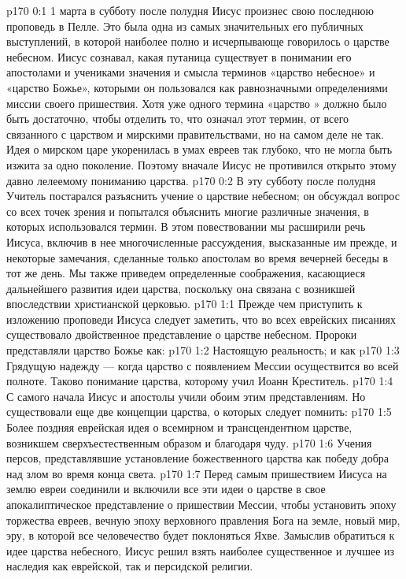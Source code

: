 \author{Комиссия срединников}
\vs p170 0:1 1 марта в субботу после полудня Иисус произнес свою последнюю проповедь в Пелле. Это была одна из самых значительных его публичных выступлений, в которой наиболее полно и исчерпывающе говорилось о царстве небесном. Иисус сознавал, какая путаница существует в понимании его апостолами и учениками значения и смысла терминов «царство небесное» и «царство Божье», которыми он пользовался как равнозначными определениями миссии своего пришествия. Хотя уже одного термина «царство » должно было быть достаточно, чтобы отделить то, что означал этот термин, от всего связанного с  царством и мирскими правительствами, но на самом деле не так. Идея о мирском царе укоренилась в умах евреев так глубоко, что не могла быть изжита за одно поколение. Поэтому вначале Иисус не противился открыто этому давно лелеемому пониманию царства.
\vs p170 0:2 В эту субботу после полудня Учитель постарался разъяснить учение о царствие небесном; он обсуждал вопрос со всех точек зрения и попытался объяснить многие различные значения, в которых использовался термин. В этом повествовании мы расширили речь Иисуса, включив в нее многочисленные рассуждения, высказанные им прежде, и некоторые замечания, сделанные только апостолам во время вечерней беседы в тот же день. Мы также приведем определенные соображения, касающиеся дальнейшего развития идеи царства, поскольку она связана с возникшей впоследствии христианской церковью.
\vs p170 1:1 Прежде чем приступить к изложению проповеди Иисуса следует заметить, что во всех еврейских писаниях существовало двойственное представление о царстве небесном. Пророки представляли царство Божье как:
\vs p170 1:2 \bibnobreakspace Настоящую реальность; и как
\vs p170 1:3 \pc {}\bibnobreakspace Грядущую надежду --- когда царство с появлением Мессии осуществится во всей полноте. Таково понимание царства, которому учил Иоанн Креститель.
\vs p170 1:4 С самого начала Иисус и апостолы учили обоим этим представлениям. Но существовали еще две концепции царства, о которых следует помнить:
\vs p170 1:5 \pc {}\bibnobreakspace Более поздняя еврейская идея о всемирном и трансцендентном царстве, возникшем сверхъестественным образом и благодаря чуду.
\vs p170 1:6 \pc {}\bibnobreakspace Учения персов, представлявшие установление божественного царства как победу добра над злом во время конца света.
\vs p170 1:7 \pc Перед самым пришествием Иисуса на землю евреи соединили и включили все эти идеи о царстве в свое апокалиптическое представление о пришествии Мессии, чтобы установить эпоху торжества евреев, вечную эпоху верховного правления Бога на земле, новый мир, эру, в которой все человечество будет поклоняться Яхве. Замыслив обратиться к идее царства небесного, Иисус решил взять наиболее существенное и лучшее из наследия как еврейской, так и персидской религии.
